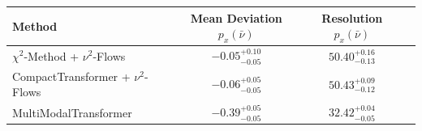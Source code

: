     \begin{tabular}{lccc}
        \toprule
        Method & Mean Deviation $p_{x}(\bar{\nu})$ & Resolution $p_{x}(\bar{\nu})$ \\
        \midrule
        $\chi^2$-Method + $\nu^2$-Flows & $-0.05^{+0.10}_{-0.05}$ & $50.40^{+0.16}_{-0.13}$ \\
        CompactTransformer + $\nu^2$-Flows & $-0.06^{+0.05}_{-0.05}$ & $50.43^{+0.09}_{-0.12}$ \\
        MultiModalTransformer & $-0.39^{+0.05}_{-0.05}$ & $32.42^{+0.04}_{-0.05}$ \\
        \bottomrule
    \end{tabular}